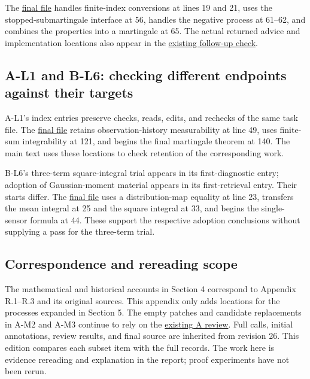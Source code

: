 The \href{research/final_sources/acceptance/r2-m1-b/technical/saved-sources/ProbabilityTheory/chapter_13/thm_13_17.lean}{final file} handles finite-index conversions at lines 19 and 21, uses the stopped-submartingale interface at 56, handles the negative process at 61–62, and combines the properties into a martingale at 65. The actual returned advice and implementation locations also appear in the \href{research/semantic/review_B_addendum.json}{existing follow-up check}.

\subsection[A-L1 and B-L6: checking different endpoints against their targets]{\texorpdfstring{\protect\hypertarget{t3}{}A-L1 and B-L6: checking different endpoints against their targets}{A-L1 and B-L6: checking different endpoints against their targets}}
A-L1's index entries preserve checks, reads, edits, and rechecks of the same task file. The \href{research/final_sources/acceptance/r2-l1-a/technical/saved-sources/ProbabilityTheory/chapter_13/prob_13_9.lean}{final file} retains observation-history measurability at line 49, uses finite-sum integrability at 121, and begins the final martingale theorem at 140. The main text uses these locations to check retention of the corresponding work.

B-L6's three-term square-integral trial appears in its first-diagnostic entry; adoption of Gaussian-moment material appears in its first-retrieval entry. Their starts differ. The \href{research/final_sources/acceptance/r2-l6-b/technical/saved-sources/ProbabilityTheory/chapter_12/prob_12_5.lean}{final file} uses a distribution-map equality at line 23, transfers the mean integral at 25 and the square integral at 33, and begins the single-sensor formula at 44. These support the respective adoption conclusions without supplying a pass for the three-term trial.

\subsection[Correspondence and rereading scope]{\texorpdfstring{\protect\hypertarget{t4}{}Correspondence and rereading scope}{Correspondence and rereading scope}}
The mathematical and historical accounts in Section 4 correspond to Appendix R.1–R.3 and its original sources. This appendix only adds locations for the processes expanded in Section 5. The empty patches and candidate replacements in A-M2 and A-M3 continue to rely on the \href{research/semantic/review_A.json}{existing A review}. Full calls, initial annotations, review results, and final source are inherited from revision 26. This edition compares each subset item with the full records. The work here is evidence rereading and explanation in the report; proof experiments have not been rerun.

\n